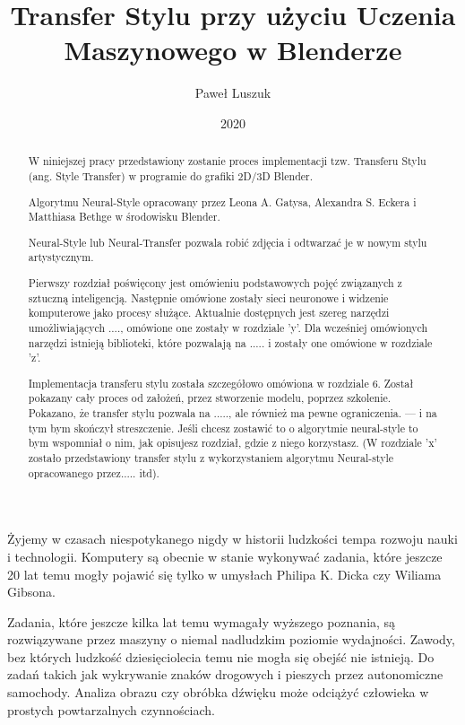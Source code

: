 \documentclass[brudnopis]{xmgr}
\author   {Paweł Luszuk}
\title    {Transfer Stylu przy użyciu Uczenia Maszynowego w Blenderze}
\date     {2020}
\begin{document}
\begin{abstract}
W niniejszej pracy przedstawiony zostanie proces implementacji tzw. Transferu Stylu (ang. Style Transfer) w programie do grafiki 2D/3D Blender.

Algorytmu Neural-Style opracowany przez Leona A. Gatysa, Alexandra S. Eckera i Matthiasa Bethge w środowisku Blender.

Neural-Style lub Neural-Transfer pozwala robić zdjęcia i odtwarzać je w nowym stylu artystycznym. 

Pierwszy rozdział poświęcony jest omówieniu podstawowych pojęć związanych z sztuczną inteligencją. Następnie omówione zostały sieci neuronowe i widzenie komputerowe jako procesy służące. Aktualnie dostępnych jest szereg narzędzi umożliwiających ...., omówione one zostały w rozdziale 'y'. Dla wcześniej omówionych narzędzi istnieją biblioteki, które pozwalają na ..... i zostały one omówione w rozdziale 'z'.

 Implementacja transferu stylu została szczegółowo omówiona w rozdziale 6. Został pokazany cały proces od założeń, przez stworzenie modelu, poprzez szkolenie. Pokazano, że transfer stylu pozwala na ....., ale również ma pewne ograniczenia. --- i na tym bym skończył streszczenie. Jeśli chcesz zostawić to o algorytmie neural-style to bym wspomniał o nim, jak opisujesz rozdział, gdzie z niego korzystasz. (W rozdziale 'x' zostało przedstawiony transfer stylu z wykorzystaniem algorytmu Neural-style opracowanego przez.....  itd).

\end{abstract}


\maketitle

\introduction

Żyjemy w czasach niespotykanego nigdy w historii ludzkości tempa rozwoju nauki i technologii. Komputery są obecnie w stanie wykonywać zadania, które jeszcze 20 lat temu mogły pojawić się tylko w umysłach Philipa K. Dicka czy Wiliama Gibsona.

Zadania, które jeszcze kilka lat temu wymagały wyższego poznania, są rozwiązywane przez maszyny o niemal nadludzkim poziomie wydajności. Zawody, bez których ludzkość dziesięciolecia temu nie mogła się obejść nie istnieją. Do zadań takich jak wykrywanie znaków drogowych i pieszych przez autonomiczne samochody. Analiza obrazu czy obróbka dźwięku może odciążyć człowieka w prostych powtarzalnych czynnościach.
\end{document}
